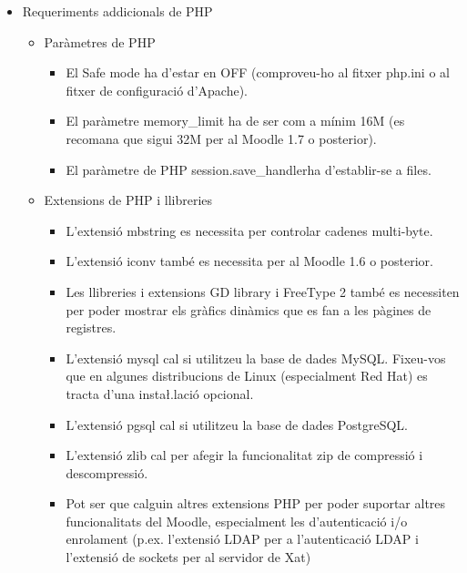 \documentclass[a4paper]{report}  %
\begin{document}
\begin{itemize}
	\item Requeriments addicionals de PHP
		\begin{itemize}
		\item Paràmetres de PHP
			\begin{itemize}
			\item El Safe mode ha d'estar en OFF (comproveu-ho al fitxer php.ini o al fitxer de configuració d'Apache).
			\item El paràmetre memory\_limit ha de ser com a mínim 16M (es recomana que sigui 32M per al Moodle 1.7 o posterior).
			\item El paràmetre de PHP session.save\_handlerha d'establir-se a files.
			\end{itemize}
		\item Extensions de PHP i llibreries
			\begin{itemize}
			\item L'extensió mbstring es necessita per controlar cadenes multi-byte. 
			\item L'extensió iconv també es necessita per al Moodle 1.6 o posterior. 
			\item Les llibreries i extensions GD library i FreeType 2 també es necessiten per poder mostrar els gràfics dinàmics que es fan a les pàgines de registres. 
			\item L'extensió mysql cal si utilitzeu la base de dades MySQL. Fixeu-vos que en algunes distribucions de Linux (especialment Red Hat) es tracta d'una insta\l.lació opcional. 
			\item L'extensió pgsql cal si utilitzeu la base de dades PostgreSQL. 
			\item L'extensió zlib cal per afegir la funcionalitat zip de compressió i descompressió. 
			\item Pot ser que calguin altres extensions PHP per poder suportar altres funcionalitats del Moodle, especialment les d'autenticació i/o enrolament (p.ex. l'extensió LDAP per a l'autenticació LDAP i l'extensió de sockets per al servidor de Xat) 
			\end{itemize}
		\end{itemize}
\end{itemize}
\end{document}
